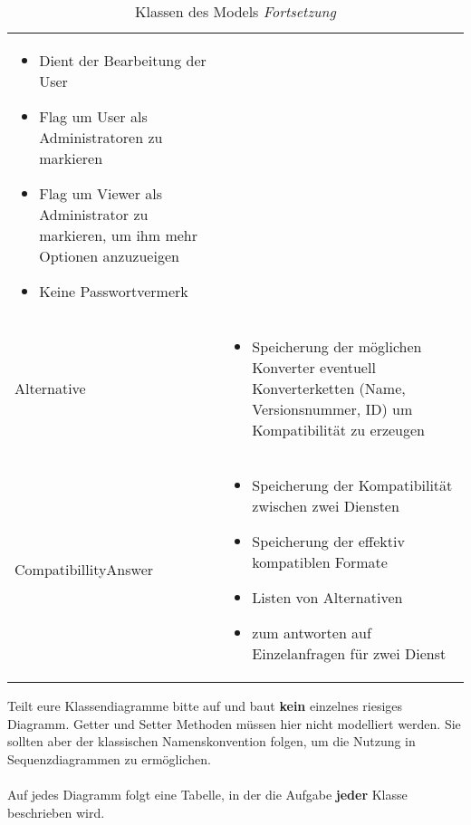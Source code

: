 \begin{table}
\begin{tabularx}{\textwidth}{p{} | X}
\begin{itemize}
			\item Dient der Bearbeitung der User
			\item Flag um User als Administratoren zu markieren
			\item Flag um Viewer als Administrator zu markieren, um ihm mehr Optionen anzuzueigen
			\item Keine Passwortvermerk
		\end{itemize}\\
		Alternative & \compress \begin{itemize}
			\item Speicherung der möglichen Konverter eventuell Konverterketten (Name, Versionsnummer, ID) um Kompatibilität zu erzeugen
		\end{itemize}\\
		\rowcolor[HTML]{E7E7E7}
		CompatibillityAnswer & \compress \begin{itemize}
			\item Speicherung der Kompatibilität zwischen zwei Diensten
			\item Speicherung der effektiv kompatiblen Formate
			\item Listen von Alternativen
			\item zum antworten auf Einzelanfragen für zwei Dienst
		\end{itemize}\\
	\end{tabularx}
	\caption{Klassen des Models \textit{Fortsetzung}}
\end{table}

\begin{tcolorbox}
Teilt eure Klassendiagramme bitte auf und baut \textbf{kein} einzelnes riesiges Diagramm.
Getter und Setter Methoden müssen hier nicht modelliert werden.
Sie sollten aber der klassischen Namenskonvention folgen, um die Nutzung in Sequenzdiagrammen zu ermöglichen.
\\\\
Auf jedes Diagramm folgt eine Tabelle, in der die Aufgabe \textbf{jeder} Klasse beschrieben wird.
\end{tcolorbox}
